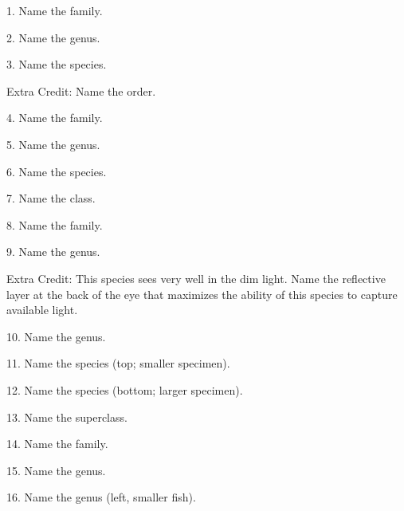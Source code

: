 \documentclass{article}
\begin{document}
{\Large 
1. Name the family.
\vspace{0.5\baselineskip}

2. Name the genus.
\vspace{0.5\baselineskip}

3. Name the species.
\vspace{0.5\baselineskip}

Extra Credit: Name the order.
\vspace{2\baselineskip}


4. Name the family.
\vspace{0.5\baselineskip}

5. Name the genus.
\vspace{0.5\baselineskip}

6. Name the species.
\vspace{2\baselineskip}


7. Name the class.
\vspace{0.5\baselineskip}

8. Name the family.
\vspace{0.5\baselineskip}

9. Name the genus.
\vspace{0.5\baselineskip}

Extra Credit: This species sees very well in the dim light. Name the reflective layer at the back of the eye that maximizes the ability of this species to capture available light.
\vspace{2\baselineskip}


10. Name the genus.
\vspace{0.5\baselineskip}

11. Name the species (top; smaller specimen).
\vspace{0.5\baselineskip}

12. Name the species (bottom; larger specimen).
\vspace{2\baselineskip}


13. Name the superclass.
\vspace{0.5\baselineskip}

14. Name the family.
\vspace{0.5\baselineskip}

15. Name the genus.
\vspace{2\baselineskip}

\newpage

16. Name the genus (left, smaller fish).
\vspace{0.5\baselineskip}

}
\end{document}
